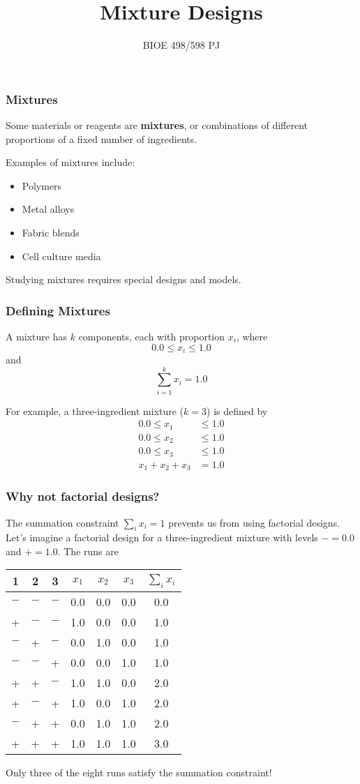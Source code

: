 \documentclass{beamer}
\title{Mixture Designs}
\date{}
\author{BIOE 498/598 PJ}
\begin{document}
\maketitle

\begin{frame}
\frametitle{Mixtures}

Some materials or reagents are \textbf{mixtures}, or combinations of different proportions of a fixed number of ingredients.

Examples of mixtures include:
\begin{itemize}
	\item Polymers
	\item Metal alloys
	\item Fabric blends
	\item Cell culture media
\end{itemize}
 
Studying mixtures requires special designs and models.
\end{frame}

\begin{frame}
\frametitle{Defining Mixtures}
 
A mixture has $k$ components, each with proportion $x_i$, where
\[ 0.0 \le x_i \le 1.0 \]
and
\[ \sum_{i=1}^k x_i = 1.0 \]

\pause
For example, a three-ingredient mixture ($k=3$) is defined by
\begin{align*}
  0.0 \le x_1 &\le 1.0 \\
  0.0 \le x_2 &\le 1.0 \\
  0.0 \le x_3 &\le 1.0 \\
  x_1 + x_2 + x_3 &= 1.0
\end{align*}
\end{frame}

\begin{frame}
\frametitle{Why not factorial designs?}

The summation constraint $\sum_i x_i=1$ prevents us from using factorial designs. Let's imagine a factorial design for a three-ingredient mixture with levels $- = 0.0$ and $+ = 1.0$. The runs are

\begin{center}
\footnotesize
\begin{tabular}{ccc|ccc|c}
	1 & 2 & 3 & $x_1$ & $x_2$ & $x_3$ & $\sum_i x_i$ \\
	\hline
	 $-$ & $-$ & $-$ & 0.0 & 0.0 & 0.0 & 0.0 \\
 	+ & $-$ & $-$ & 1.0 & 0.0 & 0.0 & 1.0 \\
 	$-$ & + & $-$ & 0.0 & 1.0 & 0.0 & 1.0 \\
 	$-$ & $-$ & + & 0.0 & 0.0 & 1.0 & 1.0 \\
 	+ & + & $-$ & 1.0 & 1.0 & 0.0 & 2.0 \\
 	+ & $-$ & + & 1.0 & 0.0 & 1.0 & 2.0 \\
 	$-$ & + & + & 0.0 & 1.0 & 1.0 & 2.0 \\
 	+ & + & + & 1.0 & 1.0 & 1.0 & 3.0
\end{tabular}
\normalsize
\end{center}
 
Only three of the eight runs satisfy the summation constraint!
\end{frame}
\end{document}

